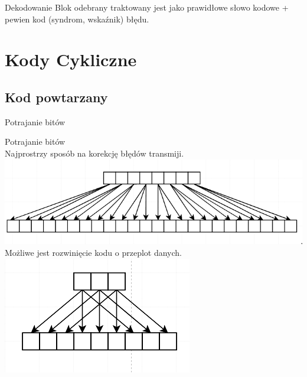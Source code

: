 \documentclass[12pt]{beamer}
\begin{document}
\begin{frame}{Dekodowanie}
Blok odebrany traktowany jest jako prawidłowe słowo kodowe + pewien kod (syndrom, wskaźnik) błędu.
\end{frame}


\section{Kody Cykliczne}
\setcounter{section}{1}

\subsection{Kod powtarzany}
\begin{frame}{Potrajanie bitów}
\begin{center}
Potrajanie bitów\\
Najprostrzy sposób na korekcję błędów transmiji.
\includegraphics[scale= 0.25]{Potrajanie/potrajanie_proste.png}\\
Możliwe jest rozwinięcie kodu o przeplot danych.
\includegraphics[scale=0.25]{Potrajanie/potrajanie_przeplot.png}

\end{center}

\end{frame}
\end{document}
